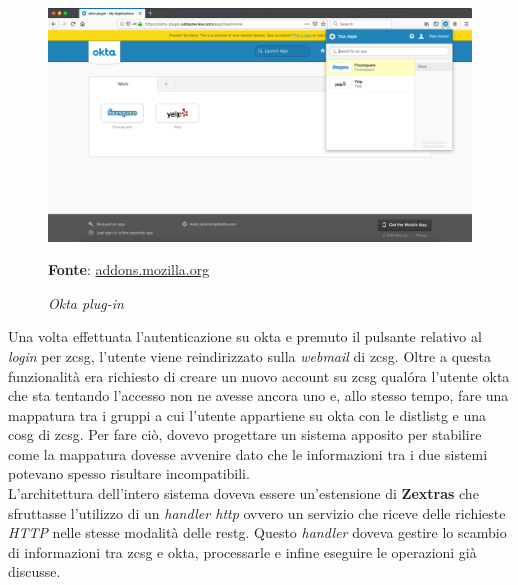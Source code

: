    \begin{figure}[h]
        \centering
        \includegraphics[width=1\textwidth]{immagini/okta_plugin.png}
        \caption{\textit{Okta plug-in}}
        \textbf{Fonte}:
        \href{https://addons.mozilla.org/en-US/firefox/addon/okta-browser-plugin/}{addons.mozilla.org}
        \label{fig: Okta plug-in}
    \end{figure}

Una volta effettuata l'autenticazione su \gls{okta} e premuto il pulsante relativo al \textit{login} per \gls{zcsg}, l'utente viene reindirizzato sulla \textit{webmail} di \gls{zcsg}.
Oltre a questa funzionalità era richiesto di creare un nuovo account su \gls{zcsg} qualóra l'utente \gls{okta} che sta tentando l'accesso non ne avesse ancora uno e, allo stesso tempo, fare una mappatura tra i gruppi a cui l'utente appartiene su \gls{okta} con le \gls{distlistg} e una \gls{cosg} di \gls{zcsg}. Per fare ciò, dovevo progettare un sistema apposito per stabilire come la mappatura dovesse avvenire dato che le informazioni tra i due sistemi potevano spesso risultare incompatibili. \\
L'architettura dell'intero sistema doveva essere un'estensione di \textbf{Zextras} che sfruttasse l'utilizzo di un \textit{handler http} ovvero un servizio che riceve delle richieste \textit{HTTP} nelle stesse modalità delle \gls{restg}. Questo \textit{handler} doveva gestire lo scambio di informazioni tra \gls{zcsg} e \gls{okta}, processarle e infine eseguire le operazioni già discusse.

